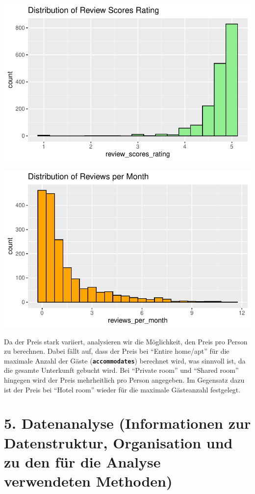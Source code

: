 \documentclass[
  journal,
]{IEEEtran}%
\begin{document}
\includegraphics{main_files/figure-pdf/eda-2.pdf}

\includegraphics{main_files/figure-pdf/eda-3.pdf}

Da der Preis stark variiert, analysieren wir die Möglichkeit, den Preis
pro Person zu berechnen. Dabei fällt auf, dass der Preis bei ``Entire
home/apt'' für die maximale Anzahl der Gäste
(\textbf{\texttt{accommodates}}) berechnet wird, was sinnvoll ist, da
die gesamte Unterkunft gebucht wird. Bei ``Private room'' und ``Shared
room'' hingegen wird der Preis mehrheitlich pro Person angegeben. Im
Gegensatz dazu ist der Preis bei ``Hotel room'' wieder für die maximale
Gästeanzahl festgelegt.

\hypertarget{datenanalyse-informationen-zur-datenstruktur-organisation-und-zu-den-fuxfcr-die-analyse-verwendeten-methoden}{%
\section{5. Datenanalyse (Informationen zur Datenstruktur, Organisation
und zu den für die Analyse verwendeten
Methoden)}\label{datenanalyse-informationen-zur-datenstruktur-organisation-und-zu-den-fuxfcr-die-analyse-verwendeten-methoden}}
\end{document}
